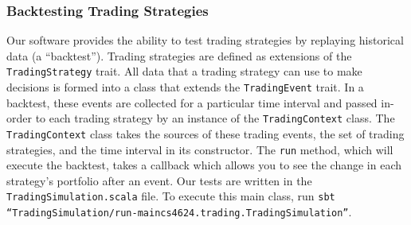 \subsubsection{Backtesting Trading Strategies}

Our software provides the ability to test trading strategies by replaying historical data (a ``backtest'').
Trading strategies are defined as extensions of the \texttt{Trading\-Strategy} trait.
All data that a trading strategy can use to make decisions is formed into a class that extends the \texttt{Trading\-Event} trait.
In a backtest, these events are collected for a particular time interval and passed in-order to each trading strategy by an instance of the \texttt{Trading\-Context} class.
The \texttt{Trading\-Context} class takes the sources of these trading events, the set of trading strategies, and the time interval in its constructor.
The \texttt{run} method, which will execute the backtest, takes a callback which allows you to see the change in each strategy's portfolio after an event.
Our tests are written in the \texttt{Trading\-Simulation.scala} file.
To execute this main class, run \texttt{sbt ``TradingSimulation/run-main\allowbreak cs4624.trading.TradingSimulation''}.

